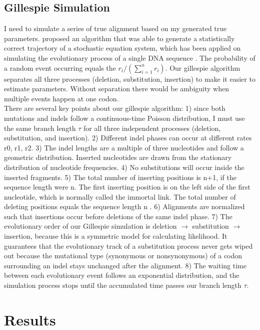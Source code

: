 \subsection{Gillespie Simulation}
I need to simulate a series of true alignment based on my generated true parameters. \citeauthor{gillespie1977exact} proposed an algorithm that was able to generate a statistically correct trajectory of a stochastic equation system, which has been applied on simulating the evolutionary process of a single DNA sequence \parencite{sipos2011phylosim}. The probability of a random event occurring equals the $r_i/(\sum_{i=1}^n r_i)$. Our gillespie algorithm separates all three processes (deletion, substitution, insertion) to make it easier to estimate parameters. Without separation there would be ambiguity when multiple events happen at one codon. \\
\indent There are several key points about our gillespie algorithm: 1) since both mutations and indels follow a continuous-time Poisson distribution, I must use the same branch length $\tau$ for all three independent processes (deletion, substitution, and insertion). 2) Different indel phases can occur at different rates r0, r1, r2. 3) The indel lengths are a multiple of three nucleotides and follow a geometric distribution. Inserted nucleotides are drawn from the stationary distribution of nucleotide frequencies. 4) No substitutions will occur inside the inserted fragments. 5) The total number of inserting positions is n+1, if the sequence length were n. The first inserting position is on the left side of the first nucleotide, which is normally called the immortal link. The total number of deleting positions equals the sequence length n \parencite{thorne1991evolutionary}. 6) Alignments are normalized such that insertions occur before deletions of the same indel phase. 7) The evolutionary order of our Gillespie simulation is deletion $\rightarrow$ substitution $\rightarrow$ insertion, because this is a symmetric model for calculating likelihood. It guarantees that the evolutionary track of a substitution process never gets wiped out because the mutational type (synonymous or nonsynonymous) of a codon surrounding an indel stays unchanged after the alignment. 8) The waiting time between each evolutionary event follows an exponential distribution, and the simulation process stops until the accumulated time passes our branch length $\tau$. 

   


\section{Results}
